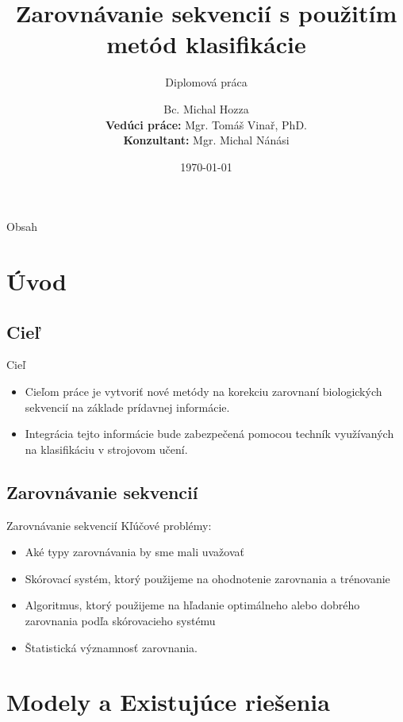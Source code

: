 \documentclass[xcolor=dvipsnames, compress, 12pt]{beamer}
\title{Zarovnávanie sekvencií s použitím metód klasifikácie}
\subtitle{
\vspace{0.5cm}
\small Diplomová práca
}
\author[Michal Hozza]{\small Bc. Michal Hozza \\ \vspace{1cm} \footnotesize \textbf{Vedúci práce:} Mgr. Tomáš Vinař, PhD. \\ \textbf{Konzultant:} Mgr. Michal Nánási\\ \vspace{.5cm}}
\institute[FMFI UK \insertshortdate]{
  Fakulta matematiky, fyziky a informatiky,
  Univerzita Komenského, Bratislava\\
}
\date[\the\year]{\footnotesize \today}
\begin{document}
\begin{frame}[plain]
  \titlepage
\end{frame}


\begin{frame}{Obsah}
  \transdissolve[duration=0.1]
  \tableofcontents
\end{frame}


\section{Úvod}
\subsection{Cieľ}
\begin{frame}{Cieľ}
  \begin{itemize}
  \item Cieľom práce je vytvoriť nové metódy na korekciu zarovnaní biologických sekvencií na základe prídavnej informácie.
  \item Integrácia tejto informácie bude zabezpečená pomocou techník využívaných na klasifikáciu v strojovom učení.
  \end{itemize} 
\end{frame}


\subsection{Zarovnávanie sekvencií}
\begin{frame}{Zarovnávanie sekvencií}
Kľúčové problémy:
  \begin{itemize}
    \pause
    \item Aké typy zarovnávania by sme mali uvažovať
    \pause
    \item Skórovací systém, ktorý použijeme na ohodnotenie zarovnania a trénovanie
    \pause
    \item Algoritmus, ktorý použijeme na hľadanie optimálneho alebo dobrého zarovnania podľa skórovacieho systému
    \pause
    \item Štatistická významnosť zarovnania.
  \end{itemize} 
\end{frame}

\section{Modely a Existujúce riešenia}
\end{document}
